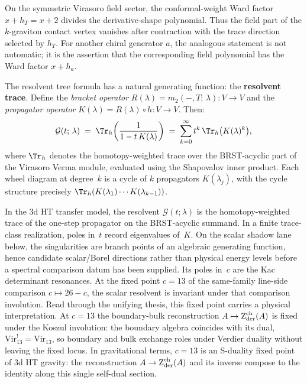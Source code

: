 \begin{remark}
On the symmetric Virasoro field sector, the conformal-weight Ward
factor \(x+h_T=x+2\) divides the derivative-shape polynomial.  Thus
the field part of the \(k\)-graviton contact vertex vanishes after
contraction with the trace direction selected by \(h_T\).  For another
chiral generator \(a\), the analogous statement is not automatic; it is
the assertion that the corresponding field polynomial has the Ward
factor \(x+h_a\).
\end{remark}

\noindent
The resolvent tree formula has a natural generating function: the
\textbf{resolvent trace}. Define the \emph{bracket operator}
$R(\lambda) = m_2(-, T;\, \lambda) \colon V \to V$
and the \emph{propagator operator}
$K(\lambda) = R(\lambda) \circ h \colon V \to V$. Then:
\providecommand{\cG}{\mathcal{G}}%
\begin{equation}\label{eq:gravity-resolvent}
\cG(t;\, \lambda)
\;=\;
\Tr_h\!\left(\frac{1}{1 - t\,K(\lambda)}\right)
\;=\;
\sum_{k=0}^{\infty} t^k\,
\Tr_h\bigl(K(\lambda)^k\bigr),
\end{equation}
where $\Tr_h$ denotes the homotopy-weighted trace over the
BRST-acyclic part of the Virasoro Verma module, evaluated
using the Shapovalov inner product. Each wheel diagram at
degree~$k$ is a cycle of $k$ propagators $K(\lambda_j)$, with
the cycle structure precisely $\Tr_h(K(\lambda_1) \cdots
K(\lambda_{k-1}))$.

In the 3d HT transfer model, the resolvent $\cG(t; \lambda)$ is the
homotopy-weighted trace of the one-step propagator on the
BRST-acyclic summand. In a finite trace-class realization, poles
in~$t$ record eigenvalues of~$K$. On the scalar shadow lane below,
the singularities are branch points of an algebraic generating
function, hence candidate scalar/Borel directions rather than
physical energy levels before a spectral comparison datum has
been supplied. Its poles in~$c$
are the Kac determinant resonances. At the fixed point
$c = 13$ of the same-family line-side comparison
$c \mapsto 26 - c$, the scalar resolvent is invariant under that
comparison involution.  Read through the unifying thesis, this
fixed point carries a physical interpretation. At $c = 13$ the boundary-bulk
reconstruction $A \mapsto \operatorname{Z}_{\mathrm{der}}^{\mathrm{ch}}(A)$ is fixed
under the Koszul involution: the boundary algebra coincides
with its dual, $\mathrm{Vir}_{13}^! = \mathrm{Vir}_{13}$,
so boundary and bulk exchange roles under Verdier duality
without leaving the fixed locus. In gravitational terms,
$c = 13$ is an S-duality fixed point of 3d HT gravity: the
reconstruction $A \to \operatorname{Z}_{\mathrm{der}}^{\mathrm{ch}}(A)$ and its
inverse compose to the identity along this single
self-dual section.

